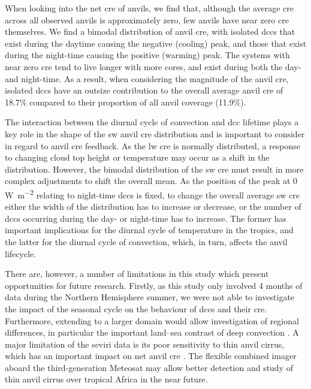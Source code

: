 \documentclass[acp, manuscript]{copernicus}
\begin{document}
When looking into the net \acrshort{cre} of anvils, we find that, although the average \acrshort{cre} across all observed anvils is approximately zero, few anvils have near zero \acrshort{cre} themselves. 
We find a bimodal distribution of anvil \acrshort{cre}, with isolated \acrshort{dcc}s that exist during the daytime causing the negative (cooling) peak, and those that exist during the night-time causing the positive (warming) peak. 
The systems with near zero \acrshort{cre} tend to live longer with more cores, and exist during both the day- and night-time. 
As a result, when considering the magnitude of the anvil \acrshort{cre}, isolated \acrshort{dcc}s have an outsize contribution to the overall average anvil \acrshort{cre} of 18.7\% compared to their proportion of all anvil coverage (11.9\%).

The interaction between the diurnal cycle of convection and \acrshort{dcc} lifetime plays a key role in the shape of the \acrshort{sw} anvil \acrshort{cre} distribution and is important to consider in regard to anvil \acrshort{cre} feedback. 
As the \acrshort{lw} \acrshort{cre} is normally distributed, a response to changing cloud top height or temperature may occur as a shift in the distribution. 
However, the bimodal distribution of the \acrshort{sw} \acrshort{cre} must result in more complex adjustments to shift the overall mean. 
As the position of the peak at 0 \,\unit{W m^{-2}} relating to night-time \acrshort{dcc}s is fixed, to change the overall average \acrshort{sw} \acrshort{cre} either the width of the distribution has to increase or decrease, or the number of \acrshort{dcc}s occurring during the day- or night-time has to increase. 
The former has important implications for the diurnal cycle of temperature in the tropics, and the latter for the diurnal cycle of convection, which, in turn, affects the anvil lifecycle.

There are, however, a number of limitations in this study which present opportunities for future research. 
Firstly, as this study only involved 4 months of data during the Northern Hemisphere summer, we were not able to investigate the impact of the seasonal cycle on the behaviour of \acrshort{dcc}s and their \acrshort{cre}. 
Furthermore, extending to a larger domain would allow investigation of regional differences, in particular the important land--sea contrast of deep convection \citep{takahashi_revisiting_2023}. 
A major limitation of the \acrshort{seviri} data is its poor sensitivity to thin anvil cirrus, which has an important impact on net anvil \acrshort{cre} \citep{protopapadaki_upper_2017, horner_evolution_2022}.
The flexible combined imager \citep{martin_fci_2021} aboard the third-generation Meteosat may allow better detection and study of thin anvil cirrus over tropical Africa in the near future.
\end{document}
